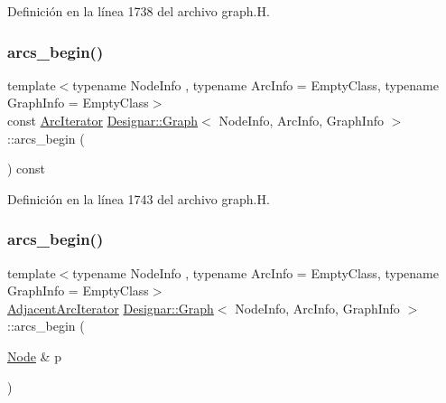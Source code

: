Definición en la línea 1738 del archivo graph.\+H.

\mbox{\label{class_designar_1_1_graph_a3906cae09045bb9c037e1c3c4e64dd97}} 
\subsubsection{\texorpdfstring{arcs\+\_\+begin()}{arcs\_begin()}\hspace{0.1cm}{\footnotesize\ttfamily [2/4]}}
{\footnotesize\ttfamily template$<$typename Node\+Info , typename Arc\+Info  = Empty\+Class, typename Graph\+Info  = Empty\+Class$>$ \\
const \hyperlink{class_designar_1_1_graph_1_1_arc_iterator}{Arc\+Iterator} \hyperlink{class_designar_1_1_graph}{Designar\+::\+Graph}$<$ Node\+Info, Arc\+Info, Graph\+Info $>$\+::arcs\+\_\+begin (\begin{DoxyParamCaption}{ }\end{DoxyParamCaption}) const\hspace{0.3cm}{\ttfamily [inline]}}



Definición en la línea 1743 del archivo graph.\+H.

\mbox{\label{class_designar_1_1_graph_a9488f4193d227a690f46e91a11dd830a}} 
\subsubsection{\texorpdfstring{arcs\+\_\+begin()}{arcs\_begin()}\hspace{0.1cm}{\footnotesize\ttfamily [3/4]}}
{\footnotesize\ttfamily template$<$typename Node\+Info , typename Arc\+Info  = Empty\+Class, typename Graph\+Info  = Empty\+Class$>$ \\
\hyperlink{class_designar_1_1_graph_1_1_adjacent_arc_iterator}{Adjacent\+Arc\+Iterator} \hyperlink{class_designar_1_1_graph}{Designar\+::\+Graph}$<$ Node\+Info, Arc\+Info, Graph\+Info $>$\+::arcs\+\_\+begin (\begin{DoxyParamCaption}\item[{\hyperlink{class_designar_1_1_graph_a5dfc7dba9d092ac489c72e40390c37d0}{Node} \&}]{p }\end{DoxyParamCaption})\hspace{0.3cm}{\ttfamily [inline]}}



